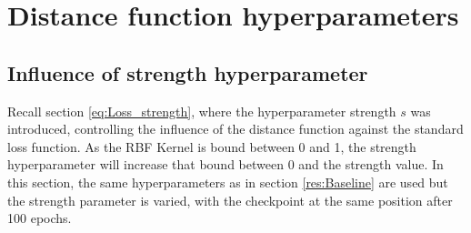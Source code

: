 \section{Distance function hyperparameters}\label{res:Hyperparameters}
\subsection{Influence of strength hyperparameter}\label{res:Strength}

Recall section \ref{eq:Loss_strength}, where the hyperparameter strength $s$ was
introduced, controlling the influence of the distance function against the
standard loss function. As the RBF Kernel is bound between 0 and 1, the strength
hyperparameter will increase that bound between 0 and the strength value. In
this section, the same hyperparameters as in section \ref{res:Baseline} are used
but the strength parameter is varied, with the checkpoint at the same position
after 100 epochs.

